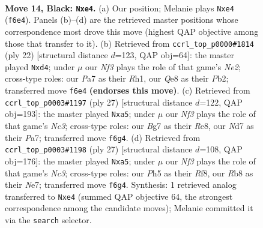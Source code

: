 \documentclass[11pt]{article}
\begin{document}
\begin{figure}[p]
\label{fig:thought-m25}
\end{figure}

\clearpage

\begin{figure}[p]\centering
\begin{subfigure}{0.46\textwidth}\centering
\resizebox{\linewidth}{!}{%
\newchessgame
\chessboard[
  setfen={1rb1qrk1/pp1n1pb1/2pp1n2/1P3p1p/P1PNP2P/2N3P1/6B1/R1BQK2R b KQ - 0 14},
  showmover=false,
  pgfstyle=straightmove, color=movearrow, markmove={f6-e4}
]}
\caption{}
\end{subfigure}\hfill
\begin{subfigure}{0.46\textwidth}\centering
\resizebox{\linewidth}{!}{%
\newchessgame
\chessboard[
  setfen={r1br2k1/pp3pbp/2nppnp1/q6P/2PpP3/2N1BP2/PP1QN1P1/2KR1B1R w - - 0 12},
  showmover=false,
  pgfstyle=straightmove, color=movearrow, markmove={e2-d4}
]}
\caption{}
\end{subfigure}
\\[4pt]
\begin{subfigure}{0.46\textwidth}\centering
\resizebox{\linewidth}{!}{%
\newchessgame
\chessboard[
  setfen={2krr3/pbp1n1pp/1pnq4/P3pp2/3P4/1QPBPP2/3BN1PP/R4RK1 b - - 0 14},
  showmover=false,
  pgfstyle=straightmove, color=movearrow, markmove={c6-a5}
]}
\caption{}
\end{subfigure}\hfill
\begin{subfigure}{0.46\textwidth}\centering
\resizebox{\linewidth}{!}{%
\newchessgame
\chessboard[
  setfen={2kr1r2/pbp1n1pp/1pnq4/P3pp2/3P4/2PBPP2/2QBN1PP/R4RK1 b - - 0 14},
  showmover=false,
  pgfstyle=straightmove, color=movearrow, markmove={c6-a5}
]}
\caption{}
\end{subfigure}
\caption{\textbf{Move 14, Black: \texttt{Nxe4}.} (a) Our position; Melanie plays \texttt{Nxe4} (\texttt{f6e4}). Panels (b)--(d) are the retrieved master positions whose correspondence most drove this move (highest QAP objective among those that transfer to it). (b) Retrieved from \texttt{ccrl\_top\_p0000\#1814} (ply 22) [structural distance $d$=123, QAP obj=64]: the master played \texttt{Nxd4}; under $\mu$ our \emph{Nf3} plays the role of that game's \emph{Ne2}; cross-type roles: our \emph{P}a7 as their \emph{R}h1, our \emph{Q}e8 as their \emph{P}b2; transferred move \texttt{f6e4} \textbf{(endorses this move)}. (c) Retrieved from \texttt{ccrl\_top\_p0003\#1197} (ply 27) [structural distance $d$=122, QAP obj=193]: the master played \texttt{Nxa5}; under $\mu$ our \emph{Nf3} plays the role of that game's \emph{Nc3}; cross-type roles: our \emph{B}g7 as their \emph{R}e8, our \emph{N}d7 as their \emph{P}a7; transferred move \texttt{f6g4}. (d) Retrieved from \texttt{ccrl\_top\_p0003\#1198} (ply 27) [structural distance $d$=108, QAP obj=176]: the master played \texttt{Nxa5}; under $\mu$ our \emph{Nf3} plays the role of that game's \emph{Nc3}; cross-type roles: our \emph{P}h5 as their \emph{R}f8, our \emph{R}b8 as their \emph{N}e7; transferred move \texttt{f6g4}. Synthesis: 1 retrieved analog transferred to \texttt{Nxe4} (summed QAP objective 64, the strongest correspondence among the candidate moves); Melanie committed it via the \texttt{search} selector.}
\label{fig:thought-m27}
\end{figure}
\end{document}
